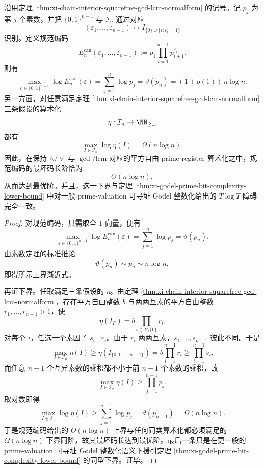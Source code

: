 \begin{corollary}\label{cor:xi-chain-interior-canonical-arithmeticization-optimal-order}
沿用定理 \ref{thm:xi-chain-interior-squarefree-gcd-lcm-normalform} 的记号。记 \(p_j\) 为第 \(j\) 个素数，并把 \(\{0,1\}^{n-1}\) 与 \(\mathcal I_n\) 通过对应
\[
(\varepsilon_1,\dots,\varepsilon_{n-1})
\longleftrightarrow
I_{\{0\}\cup\{i:\varepsilon_i=1\}}
\]
识别。定义规范编码
\[
E_n^{\mathrm{can}}(\varepsilon_1,\dots,\varepsilon_{n-1})
:=
p_1\prod_{i=1}^{n-1}p_{i+1}^{\varepsilon_i}.
\]
则有
\[
\boxed{\;
\max_{\varepsilon\in\{0,1\}^{n-1}}
\log E_n^{\mathrm{can}}(\varepsilon)
=
\sum_{j=1}^{n}\log p_j
=
\vartheta(p_n)
=
(1+o(1))\,n\log n.\;}
\]
另一方面，对任意满足定理 \ref{thm:xi-chain-interior-squarefree-gcd-lcm-normalform} 三条假设的算术化
\[
\eta:\mathcal I_n\to \NN_{\ge 1},
\]
都有
\[
\boxed{\;
\max_{I\in\mathcal I_n}\log \eta(I)=\Omega(n\log n).\;}
\]
因此，在保持 \(\wedge/\vee\) 与 \(\gcd/\mathrm{lcm}\) 对应的平方自由 prime-register 算术化之中，规范编码的最坏码长阶恰为
\[
\Theta(n\log n),
\]
从而达到最优阶。并且，这一下界与定理 \ref{thm:xi-godel-prime-bit-complexity-lower-bound} 中对一般 prime-valuation 可寻址 Gödel 整数化给出的 \(T\log T\) 障碍完全一致。
\end{corollary}
\begin{proof}
对规范编码，只需取全 \(1\) 向量，便有
\[
\max_{\varepsilon\in\{0,1\}^{n-1}}
\log E_n^{\mathrm{can}}(\varepsilon)
=
\sum_{j=1}^{n}\log p_j
=
\vartheta(p_n).
\]
由素数定理的标准推论
\[
\vartheta(p_n)\sim p_n\sim n\log n,
\]
即得所示上界渐近式。

再证下界。任取满足三条假设的 \(\eta\)。由定理 \ref{thm:xi-chain-interior-squarefree-gcd-lcm-normalform}，存在平方自由整数 \(b\) 与两两互素的平方自由整数 \(r_1,\dots,r_{n-1}>1\)，使
\[
\eta(I_F)=b\prod_{i\in F\setminus\{0\}}r_i.
\]
对每个 \(i\)，任选一个素因子 \(s_i\mid r_i\)。由于 \(r_i\) 两两互素，\(s_1,\dots,s_{n-1}\) 彼此不同。于是
\[
\max_{I\in\mathcal I_n}\eta(I)
\ge
\eta(I_{\{0,1,\dots,n-1\}})
=
b\prod_{i=1}^{n-1}r_i
\ge
\prod_{i=1}^{n-1}s_i.
\]
而任意 \(n-1\) 个互异素数的乘积都不小于前 \(n-1\) 个素数的乘积，故
\[
\max_{I\in\mathcal I_n}\eta(I)
\ge
\prod_{j=1}^{n-1}p_j.
\]
取对数即得
\[
\max_{I\in\mathcal I_n}\log \eta(I)
\ge
\sum_{j=1}^{n-1}\log p_j
=
\vartheta(p_{n-1})
=
\Omega(n\log n).
\]
于是规范编码给出的 \(O(n\log n)\) 上界与任何同类算术化都必须满足的 \(\Omega(n\log n)\) 下界同阶，故其最坏码长达到最优阶。最后一条只是在更一般的 prime-valuation 可寻址 Gödel 整数化语义下援引定理 \ref{thm:xi-godel-prime-bit-complexity-lower-bound} 的同型下界。证毕。
\end{proof}

